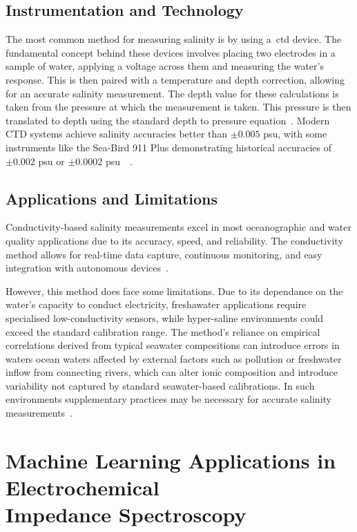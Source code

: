 \subsection{Instrumentation and Technology}
The most common method for measuring salinity is by using a~\gls{ctd} device.
The fundamental concept behind these devices involves placing two electrodes in a sample of water, applying a voltage across them and measuring the water's response. This is then paired with a temperature and depth correction, allowing for an accurate salinity measurement.
The depth value for these calculations is taken from the pressure at which the measurement is taken.
This pressure is then translated to depth using the standard depth to pressure equation~\cite{chip_based_ctd}.
Modern CTD systems achieve salinity accuracies better than $\pm0.005$ \gls{psu}, with some instruments like the Sea-Bird 911 Plus demonstrating historical accuracies of $\pm0.002$ \gls{psu} or $\pm0.0002$ \gls{psu}~\cite{chip_based_ctd}~\cite{ctd_accuracy}.

\subsection{Applications and Limitations}
Conductivity-based salinity measurements excel in most oceanographic and water quality applications due to its accuracy, speed, and reliability.
The conductivity method allows for real-time data capture, continuous monitoring, and easy integration with autonomous devices~\cite{roemmich_argo_2009}. 

However, this method does face some limitations. Due to its dependance on the water's capacity to conduct electricity, freshawater applications require specialised low-conductivity sensors, while hyper-saline environments could exceed the standard calibration range.
The method's reliance on empirical correlations derived from typical seawater compositions can introduce errors in waters ocean waters affected by external factors such as pollution or freshwater inflow from connecting rivers, which can alter ionic composition and introduce variability not captured by standard seawater-based calibrations.
In such environments supplementary practices may be necessary for accurate salinity measurements~\cite{uncles_estuarine_2002}.

\section{Machine Learning Applications in Electrochemical \\ Impedance Spectroscopy}
